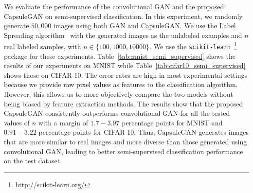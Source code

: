 We evaluate the performance of the convolutional GAN and the proposed CapsuleGAN on semi-supervised classification. In this experiment, we randomly generate $50,000$ images using both GAN and CapsuleGAN. We use the Label Spreading algorithm~\cite{bib:label_spreading} with the generated images as the unlabeled examples and $n$ real labeled samples, with $n \in \{100, 1000, 10000\}$. We use the \texttt{scikit-learn}~\footnote{http://scikit-learn.org/} package for these experiments. Table~\ref{tab:mnist_semi_supervised} shows the results of our experiments on MNIST while Table~\ref{tab:cifar10_semi_supervised} shows those on CIFAR-10. The error rates are high in most experimental settings because we provide raw pixel values as features to the classification algorithm. However, this allows us to more objectively compare the two models without being biased by feature extraction methods. The results show that the proposed CapsuleGAN consistently outperforms convolutional GAN for all the tested values of $n$ with a margin of $1.7-3.97$ percentage points for MNIST and $0.91-3.22$ percentage points for CIFAR-10. Thus, CapsuleGAN generates images that are more similar to real images and more diverse than those generated using convolutional GAN, leading to better semi-supervised classification performance on the test dataset.

